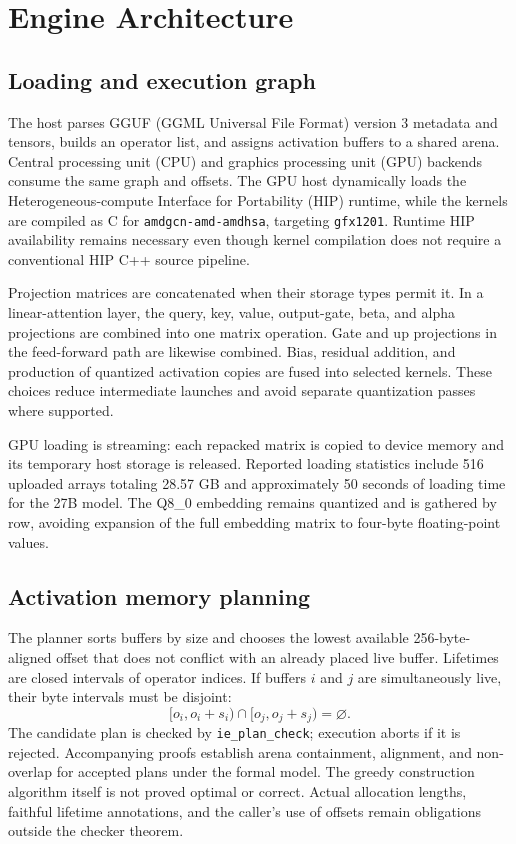 \documentclass[10pt]{article}
\begin{document}
\section{Engine Architecture}
\subsection{Loading and execution graph}
The host parses GGUF (GGML Universal File Format) version 3 metadata and tensors, builds an operator list, and assigns activation buffers to a shared arena. Central processing unit (CPU) and graphics processing unit (GPU) backends consume the same graph and offsets. The GPU host dynamically loads the Heterogeneous-compute Interface for Portability (HIP) runtime, while the kernels are compiled as C for \texttt{amdgcn-amd-amdhsa}, targeting \texttt{gfx1201}. Runtime HIP availability remains necessary even though kernel compilation does not require a conventional HIP C++ source pipeline.

Projection matrices are concatenated when their storage types permit it. In a linear-attention layer, the query, key, value, output-gate, beta, and alpha projections are combined into one matrix operation. Gate and up projections in the feed-forward path are likewise combined. Bias, residual addition, and production of quantized activation copies are fused into selected kernels. These choices reduce intermediate launches and avoid separate quantization passes where supported.

GPU loading is streaming: each repacked matrix is copied to device memory and its temporary host storage is released. Reported loading statistics include 516 uploaded arrays totaling 28.57 GB and approximately 50 seconds of loading time for the 27B model. The Q8\_0 embedding remains quantized and is gathered by row, avoiding expansion of the full embedding matrix to four-byte floating-point values.

\subsection{Activation memory planning}
The planner sorts buffers by size and chooses the lowest available 256-byte-aligned offset that does not conflict with an already placed live buffer. Lifetimes are closed intervals of operator indices. If buffers $i$ and $j$ are simultaneously live, their byte intervals must be disjoint:
\begin{equation}
 [o_i,o_i+s_i)\cap[o_j,o_j+s_j)=\varnothing.
\end{equation}
The candidate plan is checked by \texttt{ie\_plan\_check}; execution aborts if it is rejected. Accompanying proofs establish arena containment, alignment, and non-overlap for accepted plans under the formal model. The greedy construction algorithm itself is not proved optimal or correct. Actual allocation lengths, faithful lifetime annotations, and the caller's use of offsets remain obligations outside the checker theorem.
\end{document}
